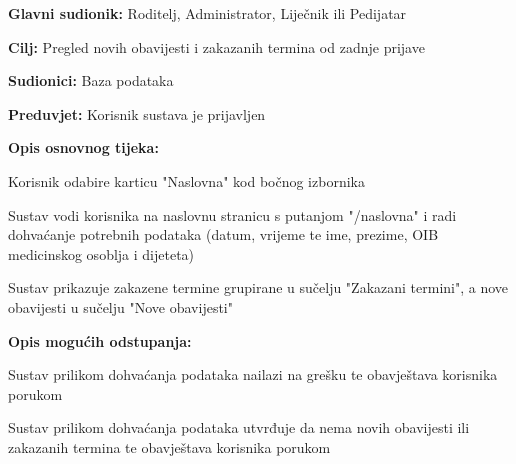 					
				\noindent {}
				\begin{packed_item}
					
					\item \textbf{Glavni sudionik: }Roditelj, Administrator, Liječnik ili Pedijatar
					\item  \textbf{Cilj:} Pregled novih obavijesti i zakazanih termina od zadnje prijave
					\item  \textbf{Sudionici:} Baza podataka
					\item  \textbf{Preduvjet:} Korisnik sustava je prijavljen
					\item  \textbf{Opis osnovnog tijeka:}
					
					\item[] \begin{packed_enum}
						
						\item Korisnik odabire karticu "Naslovna" kod bočnog izbornika
						\item Sustav vodi korisnika na naslovnu stranicu s putanjom "/naslovna" i radi dohvaćanje potrebnih podataka (datum, vrijeme te ime, prezime, OIB medicinskog osoblja i dijeteta)
						\item Sustav prikazuje zakazene termine grupirane u sučelju "Zakazani termini", a nove obavijesti u sučelju "Nove obavijesti"
					\end{packed_enum}
					
						\item  \textbf{Opis mogućih odstupanja:}
					
					\item[] \begin{packed_item}
						
						\item[3.a] Sustav prilikom dohvaćanja podataka nailazi na grešku te obavještava korisnika porukom
						
						\item[3.b] Sustav prilikom dohvaćanja podataka utvrđuje da nema novih obavijesti ili zakazanih termina te obavještava korisnika porukom				
					\end{packed_item}
					
				\end{packed_item}
				
